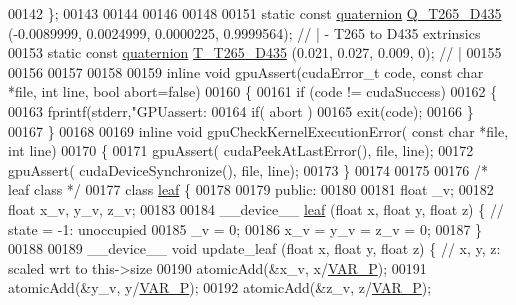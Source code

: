 \begin{DoxyCode}
00142 \};
00143 
00144 
00146 
00148 
00151 \textcolor{keyword}{static} \textcolor{keyword}{const} \hyperlink{classquaternion}{quaternion} \hyperlink{Voxel_8hpp_ae638036c15a578080c34013047df2c4f}{Q\_T265\_D435} (-0.0089999, 0.0024999, 0.0000225, 0.9999564); \textcolor{comment}{//
       | - T265 to D435 extrinsics}
00153 \textcolor{comment}{}\textcolor{keyword}{static} \textcolor{keyword}{const} \hyperlink{classquaternion}{quaternion} \hyperlink{Voxel_8hpp_a084c6bfb66f9daa4728fe8355861f1a4}{T\_T265\_D435} (0.021, 0.027, 0.009, 0);                      \textcolor{comment}{//
       |}
00155 \textcolor{comment}{}
00156 
00157 
00158 
00159 \textcolor{keyword}{inline} \textcolor{keywordtype}{void} gpuAssert(cudaError\_t code, \textcolor{keyword}{const} \textcolor{keywordtype}{char} *file, \textcolor{keywordtype}{int} line, \textcolor{keywordtype}{bool} abort=\textcolor{keyword}{false})
00160 \{
00161     \textcolor{keywordflow}{if} (code != cudaSuccess) 
00162     \{
00163         fprintf(stderr,\textcolor{stringliteral}{"GPUassert: %
00164         \textcolor{keywordflow}{if}( abort )
00165             exit(code);
00166     \}
00167 \}
00168 
00169 \textcolor{keyword}{inline} \textcolor{keywordtype}{void} gpuCheckKernelExecutionError( \textcolor{keyword}{const} \textcolor{keywordtype}{char} *file, \textcolor{keywordtype}{int} line)
00170 \{
00171     gpuAssert( cudaPeekAtLastError(), file, line);
00172     gpuAssert( cudaDeviceSynchronize(), file, line);    
00173 \}
00174 
00175 
00176 \textcolor{comment}{/* leaf class */}
00177 \textcolor{keyword}{class }\hyperlink{classleaf}{leaf} \{
00178 
00179 \textcolor{keyword}{public}:
00180 
00181     \textcolor{keywordtype}{float} \_v;
00182     \textcolor{keywordtype}{float} x\_v, y\_v, z\_v;
00183 
00184     \_\_device\_\_ \hyperlink{classleaf}{leaf} (\textcolor{keywordtype}{float} x, \textcolor{keywordtype}{float} y, \textcolor{keywordtype}{float} z) \{ \textcolor{comment}{// state = -1: unoccupied}
00185         \_v = 0;
00186         x\_v = y\_v = z\_v = 0;
00187     \}
00188 
00189     \_\_device\_\_ \textcolor{keywordtype}{void} update\_leaf (\textcolor{keywordtype}{float} x, \textcolor{keywordtype}{float} y, \textcolor{keywordtype}{float} z) \{ \textcolor{comment}{// x, y, z: scaled wrt to this->size}
00190         atomicAdd(&x\_v, x/\hyperlink{Voxel_8hpp_ae1cd6283839fc3aebf9bccbd1044a365}{VAR\_P});
00191         atomicAdd(&y\_v, y/\hyperlink{Voxel_8hpp_ae1cd6283839fc3aebf9bccbd1044a365}{VAR\_P});
00192         atomicAdd(&z\_v, z/\hyperlink{Voxel_8hpp_ae1cd6283839fc3aebf9bccbd1044a365}{VAR\_P});
}
\end{DoxyCode}
